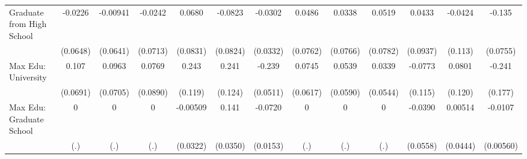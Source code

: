 {\begin{tabular}{l*{12}{c}}
\addlinespace
Graduate from High School&     -0.0226         &    -0.00941         &     -0.0242         &      0.0680         &     -0.0823         &     -0.0302         &      0.0486         &      0.0338         &      0.0519         &      0.0433         &     -0.0424         &      -0.135         \\
            &    (0.0648)         &    (0.0641)         &    (0.0713)         &    (0.0831)         &    (0.0824)         &    (0.0332)         &    (0.0762)         &    (0.0766)         &    (0.0782)         &    (0.0937)         &     (0.113)         &    (0.0755)         \\
\addlinespace
Max Edu: University&       0.107         &      0.0963         &      0.0769         &       0.243\sym{*}  &       0.241         &      -0.239\sym{***}&      0.0745         &      0.0539         &      0.0339         &     -0.0773         &      0.0801         &      -0.241         \\
            &    (0.0691)         &    (0.0705)         &    (0.0890)         &     (0.119)         &     (0.124)         &    (0.0511)         &    (0.0617)         &    (0.0590)         &    (0.0544)         &     (0.115)         &     (0.120)         &     (0.177)         \\
\addlinespace
Max Edu: Graduate School&           0         &           0         &           0         &    -0.00509         &       0.141\sym{***}&     -0.0720\sym{***}&           0         &           0         &           0         &     -0.0390         &     0.00514         &     -0.0107         \\
            &         (.)         &         (.)         &         (.)         &    (0.0322)         &    (0.0350)         &    (0.0153)         &         (.)         &         (.)         &         (.)         &    (0.0558)         &    (0.0444)         &   (0.00560)         \\
\bottomrule
\end{tabular}
}
